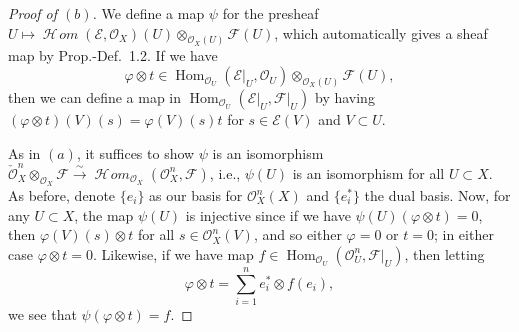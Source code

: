 \documentclass[10pt]{article}
\theoremstyle{definition}
\theoremstyle{remark}
\numberwithin{equation}{section}
\numberwithin{figure}{subsubsection}
\DeclareMathOperator{\Hom}{Hom}
\newcommand{\EE}{\mathscr{E}}
\newcommand{\FF}{\mathscr{F}}
\newcommand{\OO}{\mathcal{O}}
\DeclareMathOperator{\HHom}{\mathscr{H}\!\mathit{om}}
\newcommand{\isoto}{\overset{\sim}{\to}}
\begin{document}
\begin{proof}[Proof of $(b)$]
  We define a map $\psi$ for the presheaf $U \mapsto \HHom(\EE,\OO_X)(U) \otimes_{\OO_X(U)} \FF(U)$, which automatically gives a sheaf map by Prop.-Def.~1.2. If we have
  \begin{equation*}
    \varphi \otimes t \in \Hom_{\OO_U}(\EE\vert_U,\OO_U) \otimes_{\OO_X(U)} \FF(U),
  \end{equation*}
  then we can define a map in $\Hom_{\OO_U}(\EE\vert_U,\FF\vert_U)$ by having $(\varphi \otimes t)(V)(s) = \varphi(V)(s)t$ for $s \in \EE(V)$ and $V \subset U$.
  \par As in $(a)$, it suffices to show $\psi$ is an isomorphism $\check{\OO}_X^n \otimes_{\OO_X} \FF \isoto \HHom_{\OO_X}(\OO_X^n,\FF)$, i.e., $\psi(U)$ is an isomorphism for all $U \subset X$. As before, denote $\{e_i\}$ as our basis for $\OO_X^n(X)$ and $\{e_i^*\}$ the dual basis. Now, for any $U \subset X$, the map $\psi(U)$ is injective since if we have $\psi(U)(\varphi \otimes t) = 0$, then $\varphi(V)(s) \otimes t$ for all $s \in \OO_X^n(V)$, and so either $\varphi = 0$ or $t = 0$; in either case $\varphi \otimes t = 0$. Likewise, if we have map $f \in \Hom_{\OO_U}(\OO_U^n,\FF\vert_U)$, then letting
  \begin{equation*}
    \varphi \otimes t = \sum_{i=1}^n e_i^* \otimes f(e_i),
  \end{equation*}
  we see that $\psi(\varphi \otimes t) = f$.
\end{proof}
\end{document}
